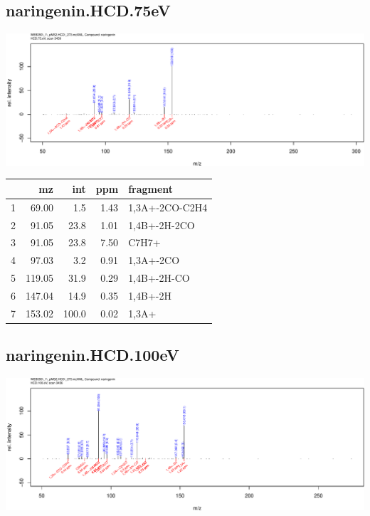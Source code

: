 \documentclass[]{article}
\begin{document}
\clearpage\subsection{naringenin.HCD.75eV}
\includegraphics[width=\textwidth]{WEB350_files/figure-latex/unnamed-chunk-3-2}

\begin{table}[ht]
\centering
\begin{tabular}{rrrrl}
  \toprule
 & mz & int & ppm & fragment \\ 
  \midrule
1 & 69.00 & 1.5 & 1.43 & 1,3A+-2CO-C2H4 \\ 
  2 & 91.05 & 23.8 & 1.01 & 1,4B+-2H-2CO \\ 
  3 & 91.05 & 23.8 & 7.50 & C7H7+ \\ 
  4 & 97.03 & 3.2 & 0.91 & 1,3A+-2CO \\ 
  5 & 119.05 & 31.9 & 0.29 & 1,4B+-2H-CO \\ 
  6 & 147.04 & 14.9 & 0.35 & 1,4B+-2H \\ 
  7 & 153.02 & 100.0 & 0.02 & 1,3A+ \\ 
   \bottomrule
\end{tabular}
\end{table}

\clearpage\subsection{naringenin.HCD.100eV}
\includegraphics[width=\textwidth]{WEB350_files/figure-latex/unnamed-chunk-3-3}
\end{document}
